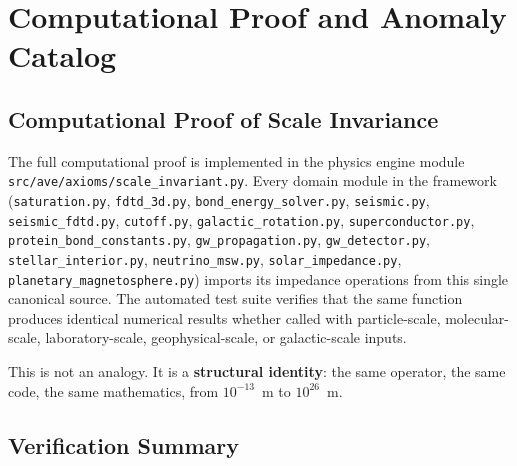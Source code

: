 
\chapter{Computational Proof and Anomaly Catalog}
\label{ch:computational_proof}

\section{Computational Proof of Scale Invariance}

The full computational proof is implemented in the physics engine module
\texttt{src/ave/axioms/scale\_invariant.py}. Every domain module in the
framework (\texttt{saturation.py}, \texttt{fdtd\_3d.py},
\texttt{bond\_energy\_solver.py}, \texttt{seismic.py},
\texttt{seismic\_fdtd.py}, \texttt{cutoff.py},
\texttt{galactic\_rotation.py}, \texttt{superconductor.py},
\texttt{protein\_bond\_constants.py},
\texttt{gw\_propagation.py},
\texttt{gw\_detector.py},
\texttt{stellar\_interior.py},
\texttt{neutrino\_msw.py},
\texttt{solar\_impedance.py},
\texttt{planetary\_magnetosphere.py}) imports its impedance
operations from this single canonical source. The automated test suite
verifies that the same
function produces identical numerical results whether called with
particle-scale, molecular-scale, laboratory-scale, geophysical-scale,
or galactic-scale inputs.

This is not an analogy. It is a \textbf{structural identity}: the same
operator, the same code, the same mathematics, from $10^{-13}$~m to
$10^{26}$~m.

\section{Verification Summary}

